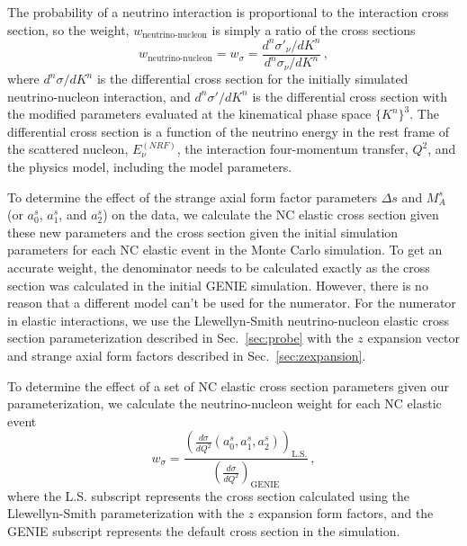     The probability of a neutrino interaction is proportional to the
    interaction cross section, so the weight, $w_{\textrm{neutrino-nucleon}}$
    is simply a ratio of the cross sections
    \begin{equation}
      w_{\textrm{neutrino-nucleon}} = w_{\sigma} 
        = \frac{d^n\sigma'_{\nu}/dK^n}{d^n\sigma_{\nu}/dK^n} \,,
    \end{equation}
    where $d^n\sigma/dK^n$ is the differential cross section for the initially
    simulated neutrino-nucleon interaction, and $d^n\sigma'/dK^n$ is the
    differential cross section with the modified parameters evaluated at the
    kinematical phase space $\{K^n\}^3$. The differential cross section is a
    function of the neutrino energy in the rest frame of the scattered nucleon,
    $E_{\nu}^{(NRF)}$, the interaction four-momentum transfer, $Q^2$, and the
    physics model, including the model parameters.

    To determine the effect of the strange axial form factor parameters $\Delta
    s$ and $M_A^s$ (or $a_0^s$, $a_1^s$, and $a_2^s$) on the data, we calculate
    the NC elastic cross section given these new parameters and the cross
    section given the initial simulation parameters for each NC elastic event
    in the Monte Carlo simulation. To get an accurate weight, the denominator
    needs to be calculated exactly as the cross section was calculated in the
    initial GENIE simulation. However, there is no reason that a different
    model can't be used for the numerator. For the numerator in elastic
    interactions, we use the Llewellyn-Smith neutrino-nucleon elastic cross
    section parameterization described in Sec.~\ref{sec:probe} with the $z$
    expansion vector and strange axial form factors described in
    Sec.~\ref{sec:zexpansion}.

    To determine the effect of a set of NC elastic cross section parameters
    given our parameterization, we calculate the neutrino-nucleon weight for
    each NC elastic event
    \begin{equation}\label{eq:xsecweight}
      w_\sigma = \frac{\left(\frac{d\sigma}{dQ^2}(a_0^s,a_1^s,a_2^s)\right)_{\textrm{L.S.}}}
                      {\left(\frac{d\sigma}{dQ^2}\right)_{\textrm{GENIE}}} \,,
    \end{equation}
    where the L.S. subscript represents the cross section calculated using the
    Llewellyn-Smith parameterization with the $z$ expansion form factors, and
    the GENIE subscript represents the default cross section in the simulation.

